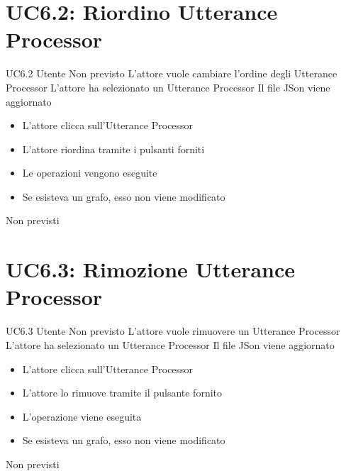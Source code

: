 \documentclass[../AnalisideiRequisiti.tex]{subfiles}
\begin{document}
\section{UC6.2: Riordino Utterance Processor}
\UserCase
{UC6.2}
{Utente}
{Non previsto}
{L'attore vuole cambiare l'ordine degli Utterance Processor}
{L'attore ha selezionato un Utterance Processor }
{Il file JSon viene aggiornato}
{
	\begin{itemize}
		\item{} L'attore clicca sull'Utterance Processor 
		\item{} L'attore riordina tramite i pulsanti forniti	
		\item{} Le operazioni vengono eseguite
		\item{} Se esisteva un grafo, esso non viene modificato
		
	\end{itemize}
}
{Non previsti}

\section{UC6.3: Rimozione Utterance Processor}
\UserCase
{UC6.3}
{Utente}
{Non previsto}
{L'attore vuole rimuovere un Utterance Processor}
{L'attore ha selezionato un Utterance Processor }
{Il file JSon viene aggiornato}
{
	\begin{itemize}
		\item{} L'attore clicca sull'Utterance Processor 
		\item{} L'attore lo rimuove tramite il pulsante fornito	
		\item{} L'operazione viene eseguita
		\item{} Se esisteva un grafo, esso non viene modificato
		
	\end{itemize}
}
{Non previsti}
\end{document}
